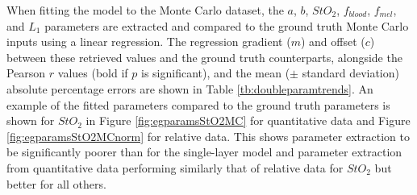 When fitting the model to the Monte Carlo dataset, the $a$, $b$, $StO_2$, $f_{blood}$, $f_{mel}$, and $L_1$ parameters are extracted and compared to the ground truth Monte Carlo inputs using a linear regression. The regression gradient ($m$) and offset ($c$) between these retrieved values and the ground truth counterparts, alongside the Pearson $r$ values (bold if $p$ is significant), and the mean ($\pm$ standard deviation) absolute percentage errors are shown in Table \ref{tb:doubleparamtrends}. An example of the fitted parameters compared to the ground truth parameters is shown for $StO_2$ in Figure \ref{fig:egparamsStO2MC} for quantitative data and Figure \ref{fig:egparamsStO2MCnorm} for relative data. This shows parameter extraction to be significantly poorer than for the single-layer model and parameter extraction from quantitative data performing similarly that of relative data for $StO_2$ but better for all others. 
